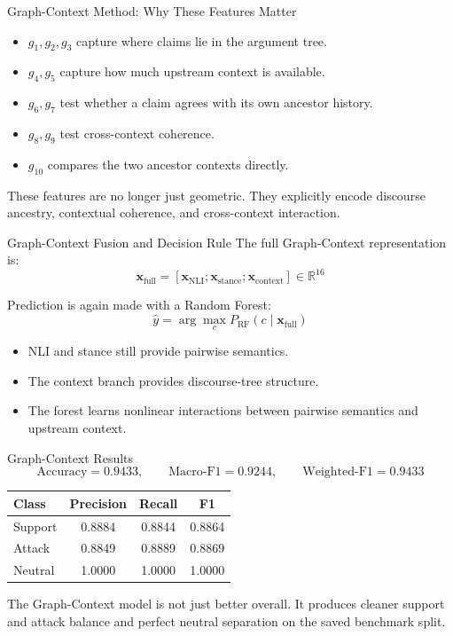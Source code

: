 \documentclass[aspectratio=169, 10pt]{beamer}
\newcommand{\researchbox}[2]{%
  \begin{tcolorbox}[colback=accentorange!10, colframe=accentorange,
    title={\textbf{Research Lens:} #1}, fonttitle=\bfseries\small,
    left=4pt, right=4pt, top=3pt, bottom=3pt, boxrule=1pt]
    \small #2
  \end{tcolorbox}}
\newcommand{\takeawaybox}[2]{%
  \begin{tcolorbox}[colback=accentgreen!10, colframe=accentgreen,
    title={\textbf{Takeaway:} #1}, fonttitle=\bfseries\small,
    left=4pt, right=4pt, top=3pt, bottom=3pt, boxrule=1pt]
    \small #2
  \end{tcolorbox}}
\begin{document}
\begin{frame}{Graph-Context Method: Why These Features Matter}
\begin{itemize}
  \item \(g_1,g_2,g_3\) capture where claims lie in the argument tree.
  \item \(g_4,g_5\) capture how much upstream context is available.
  \item \(g_6,g_7\) test whether a claim agrees with its own ancestor history.
  \item \(g_8,g_9\) test cross-context coherence.
  \item \(g_{10}\) compares the two ancestor contexts directly.
\end{itemize}

\researchbox{Why This Is Stronger}{
These features are no longer just geometric. They explicitly encode discourse ancestry, contextual coherence, and cross-context interaction.
}
\end{frame}

\begin{frame}{Graph-Context Fusion and Decision Rule}
The full Graph-Context representation is:
\[
\mathbf{x}_{\mathrm{full}}=
[\mathbf{x}_{\mathrm{NLI}};\mathbf{x}_{\mathrm{stance}};\mathbf{x}_{\mathrm{context}}]
\in\mathbb{R}^{16}
\]

Prediction is again made with a Random Forest:
\[
\hat y = \arg\max_{c}
P_{\mathrm{RF}}(c\mid \mathbf{x}_{\mathrm{full}})
\]

\begin{itemize}
  \item NLI and stance still provide pairwise semantics.
  \item The context branch provides discourse-tree structure.
  \item The forest learns nonlinear interactions between pairwise semantics and upstream context.
\end{itemize}
\end{frame}

\begin{frame}{Graph-Context Results}
\[
\text{Accuracy}=0.9433,\qquad
\text{Macro-F1}=0.9244,\qquad
\text{Weighted-F1}=0.9433
\]

\begin{center}
\begin{tabular}{lccc}
\toprule
Class & Precision & Recall & F1 \\
\midrule
Support & 0.8884 & 0.8844 & 0.8864 \\
Attack & 0.8849 & 0.8889 & 0.8869 \\
Neutral & 1.0000 & 1.0000 & 1.0000 \\
\bottomrule
\end{tabular}
\end{center}

\takeawaybox{Interpretation}{
The Graph-Context model is not just better overall. It produces cleaner support and attack balance and perfect neutral separation on the saved benchmark split.
}
\end{frame}
\end{document}
